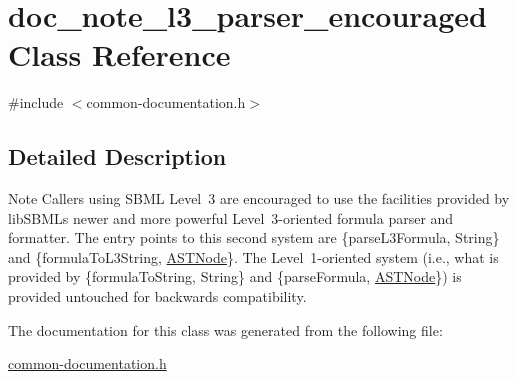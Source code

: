 \hypertarget{classdoc__note__l3__parser__encouraged}{}\section{doc\+\_\+note\+\_\+l3\+\_\+parser\+\_\+encouraged Class Reference}
\label{classdoc__note__l3__parser__encouraged}


{\ttfamily \#include $<$common-\/documentation.\+h$>$}



\subsection{Detailed Description}
\begin{DoxyNote}{Note}
Callers using S\+B\+ML Level~3 are encouraged to use the facilities provided by lib\+S\+B\+ML\textquotesingle{}s newer and more powerful Level~3-\/oriented formula parser and formatter. The entry points to this second system are \{parse\+L3\+Formula, String\} and \{formula\+To\+L3\+String, \hyperlink{class_a_s_t_node}{A\+S\+T\+Node}\}. The Level~1-\/oriented system (i.\+e., what is provided by \{formula\+To\+String, String\} and \{parse\+Formula, \hyperlink{class_a_s_t_node}{A\+S\+T\+Node}\}) is provided untouched for backwards compatibility. 
\end{DoxyNote}


The documentation for this class was generated from the following file\+:\begin{DoxyCompactItemize}
\item 
\hyperlink{common-documentation_8h}{common-\/documentation.\+h}\end{DoxyCompactItemize}

